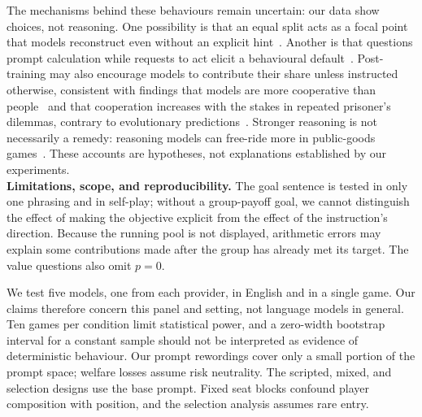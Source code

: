 \documentclass[sigconf,anonymous]{aamas}
\begin{document}
The mechanisms behind these behaviours remain uncertain: our data show choices, not reasoning. One possibility is that an equal split acts as a focal point that models reconstruct even without an explicit hint~\cite{dodivers2025uncovering}. Another is that questions prompt calculation while requests to act elicit a behavioural default~\cite{fan2024can,schmied2026llms}. Post-training may also encourage models to contribute their share unless instructed otherwise, consistent with findings that models are more cooperative than people~\cite{mei2024turing} and that cooperation increases with the stakes in repeated prisoner’s dilemmas, contrary to evolutionary predictions~\cite{huynh2026payoff}. Stronger reasoning is not necessarily a remedy: reasoning models can free-ride more in public-goods games~\cite{guzmanpiedrahita2025corrupted}. These accounts are hypotheses, not explanations established by our experiments.\\



\noindent\textbf{Limitations, scope, and reproducibility.}
The goal sentence is tested in only one phrasing and in self-play; without a group-payoff goal, we cannot distinguish the effect of making the objective explicit from the effect of the instruction’s direction. Because the running pool is not displayed, arithmetic errors may explain some contributions made after the group has already met its target. The value questions also omit $p=0$.

We test five models, one from each provider, in English and in a single game. Our claims therefore concern this panel and setting, not language models in general. Ten games per condition limit statistical power, and a zero-width bootstrap interval for a constant sample should not be interpreted as evidence of deterministic behaviour. Our prompt rewordings cover only a small portion of the prompt space; welfare losses assume risk neutrality. The scripted, mixed, and selection designs use the base prompt. Fixed seat blocks confound player composition with position, and the selection analysis assumes rare entry.

\end{document}
